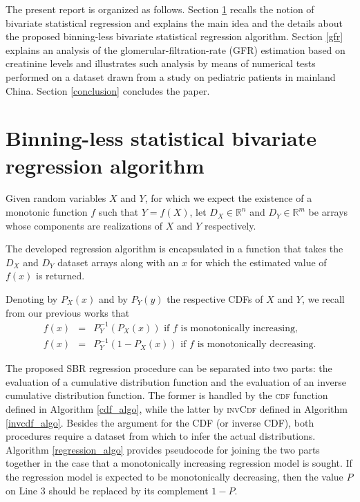 \documentclass[10pt,final]{siamltex}
\begin{document}
The present report is organized as follows. Section \ref{blsbr} recalls the notion of bivariate statistical regression and explains the main idea and the details about the proposed binning-less bivariate statistical regression algorithm. Section \ref{gfr} explains an analysis of the glomerular-filtration-rate (GFR) estimation based on creatinine levels and illustrates such analysis by means of numerical tests performed on a dataset drawn from a study on pediatric patients in mainland China. Section \ref{conclusion} concludes the paper.
%
\section{Binning-less statistical bivariate regression algorithm}\label{blsbr}
%
Given random variables $X$ and $Y$, for which we expect the existence of a monotonic function $f$ such that $Y=f(X)$, let $D_X \in \mathbb{R}^n$ and $D_Y \in \mathbb{R}^m$ be arrays whose components are realizations of $X$ and $Y$ respectively.

The developed regression algorithm is encapsulated in a function that takes the $D_X$ and $D_Y$ dataset arrays along with an $x$ for which the estimated value of $f(x)$ is returned.

Denoting by $P_X(x)$ and by $P_Y(y)$ the respective CDFs of $X$ and $Y$, we recall from our previous works \cite{fiori,fgl} that
%
\begin{eqnarray}
  f(x) & = & P_Y^{-1}(P_X(x)) \text{ if $f$ is monotonically increasing},\\
  f(x) & = & P_Y^{-1}(1-P_X(x)) \text{ if $f$ is monotonically decreasing}.
\end{eqnarray}
%

The proposed SBR regression procedure can be separated into two parts: the evaluation of a cumulative distribution function and the evaluation of an inverse cumulative distribution function. The former is handled by the \textsc{cdf} function defined in Algorithm \ref{cdf_algo}, while the latter by \textsc{invCdf} defined in Algorithm \ref{invcdf_algo}. Besides the argument for the CDF (or inverse CDF), both procedures require a dataset from which to infer the actual distributions. Algorithm \ref{regression_algo} provides pseudocode for joining the two parts together in the case that a monotonically increasing regression model is sought. If the regression model is expected to be monotonically decreasing, then the value $P$ on Line 3 should be replaced by its complement $1-P$.
\end{document}
